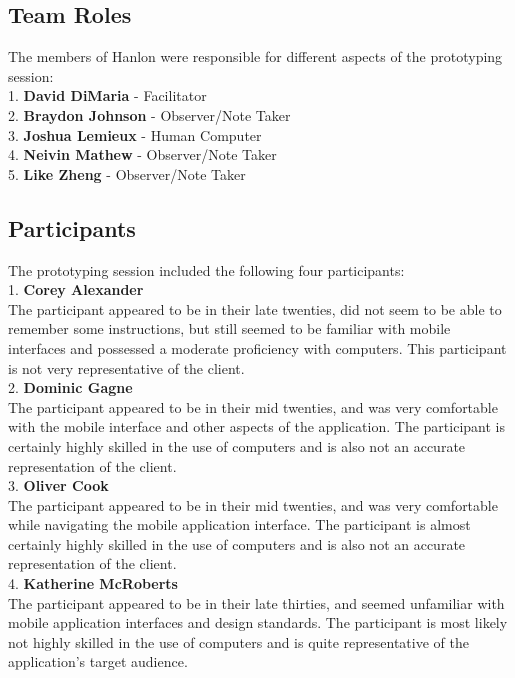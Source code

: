 \documentclass[12pt,letterpaper]{article}
\begin{document}
\subsection{Team Roles}
The members of Hanlon were responsible for different aspects of the prototyping session:\\
1. \textbf{\hspace*{8pt}David DiMaria} - Facilitator\\
2. \textbf{\hspace*{8pt}Braydon Johnson} - Observer/Note Taker\\
3. \textbf{\hspace*{8pt}Joshua Lemieux} - Human Computer\\
4. \textbf{\hspace*{8pt}Neivin Mathew} - Observer/Note Taker\\
5. \textbf{\hspace*{8pt}Like Zheng} - Observer/Note Taker
\subsection{Participants}
The prototyping session included the following four participants:\\
1.\hspace*{8pt} \textbf{Corey Alexander}\\
The participant appeared to be in their late twenties, did not seem to be able to remember some instructions, but still seemed to be familiar with mobile interfaces and possessed a moderate proficiency with computers. This participant is not very representative of the client.\\[0.5\baselineskip]
2.\hspace*{8pt} \textbf{Dominic Gagne}\\
The participant appeared to be in their mid twenties, and was very comfortable with the mobile interface and other aspects of the application. The participant is certainly highly skilled in the use of computers and is also not an accurate representation of the client.\\[0.5\baselineskip]
3.\hspace*{8pt} \textbf{Oliver Cook}\\
The participant appeared to be in their mid twenties, and was very comfortable while navigating the mobile application interface. The participant is almost certainly highly skilled in the use of computers and is also not an accurate representation of the client.\\[0.5\baselineskip]
4.\hspace*{8pt} \textbf{Katherine McRoberts}\\
The participant appeared to be in their late thirties, and seemed unfamiliar with mobile application interfaces and design standards. The participant is most likely not highly skilled in the use of computers and is quite representative of the application's target audience.
 
\end{document}
